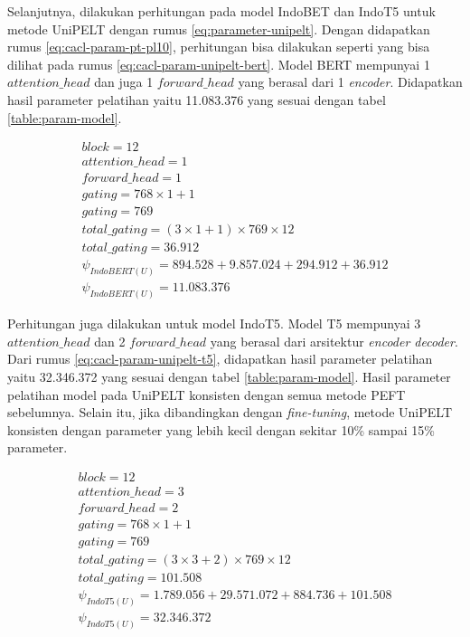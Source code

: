 Selanjutnya, dilakukan perhitungan pada model IndoBET dan IndoT5 untuk metode UniPELT dengan rumus \ref{eq:parameter-unipelt}. Dengan didapatkan rumus \ref{eq:cacl-param-pt-pl10}, perhitungan bisa dilakukan seperti yang bisa dilihat pada rumus \ref{eq:cacl-param-unipelt-bert}. Model BERT mempunyai 1 $attention\_head$ dan juga 1 $forward\_head$ yang berasal dari 1 \textit{encoder}. Didapatkan hasil parameter pelatihan yaitu 11.083.376 yang sesuai dengan tabel \ref{table:param-model}.

\begin{equation}
    \begin{aligned}
        block = 12 \\
        attention\_head = 1 \\
        forward\_head = 1 \\
        gating = 768 \times 1 + 1 \\
        gating = 769 \\
        total\_gating = (3 \times 1 + 1) \times 769 \times 12 \\
        total\_gating = 36.912 \\
        \psi_{IndoBERT(U)} = 894.528 + 9.857.024 + 294.912 + 36.912 \\
        \psi_{IndoBERT(U)} = 11.083.376
    \end{aligned}
    \label{eq:cacl-param-unipelt-bert}
\end{equation}

Perhitungan juga dilakukan untuk model IndoT5. Model T5 mempunyai 3 $attention\_head$ dan 2 $forward\_head$ yang berasal dari arsitektur \textit{encoder decoder}. Dari rumus \ref{eq:cacl-param-unipelt-t5}, didapatkan hasil parameter pelatihan yaitu 32.346.372 yang sesuai dengan tabel \ref{table:param-model}. Hasil parameter pelatihan model pada UniPELT konsisten dengan semua metode PEFT sebelumnya. Selain itu, jika dibandingkan dengan \textit{fine-tuning}, metode UniPELT konsisten dengan parameter yang lebih kecil dengan sekitar 10\% sampai 15\% parameter.

\begin{equation}
    \begin{aligned}
        block = 12 \\
        attention\_head = 3 \\
        forward\_head = 2 \\
        gating = 768 \times 1 + 1 \\
        gating = 769 \\
        total\_gating = (3 \times 3 + 2) \times 769 \times 12 \\
        total\_gating =  101.508 \\
        \psi_{IndoT5(U)} = 1.789.056 + 29.571.072 + 884.736 + 101.508 \\
        \psi_{IndoT5(U)} = 32.346.372 \\
    \end{aligned}
    \label{eq:cacl-param-unipelt-t5}
\end{equation}
